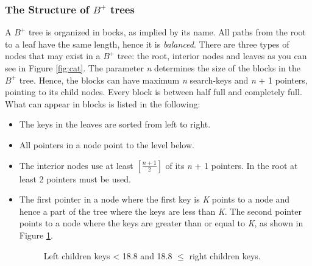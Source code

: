 \documentclass[abstracton,12pt]{scrreprt}
\begin{document}
\subsubsection{The Structure of $B^+$ trees}
\label{structureBtree}
A $B^+$ tree is organized in bocks, as implied by its name. All paths from the root to a leaf have the same length, hence it is \emph{balanced}. There are three types of nodes that may exist in a $B^+$ tree: the root, interior nodes and leaves as you can see in Figure \ref{fig:cat}. The parameter \emph{n} determines the size of the blocks in the $B^+$ tree. Hence, the blocks can have maximum \emph{n} search-keys and \emph{n} + 1 pointers, pointing to its child nodes. Every block is between half full and completely full. What can appear in blocks is listed in the following: \\
\begin{itemize}  
	\item The keys in the leaves are sorted from left to right. 
	\item All pointers in a node point to the level below.
	\item The interior nodes use at least $[\frac{n+1}{2}]$ of its \emph{n} + 1 pointers. In the root at least 2 pointers must be used. 
	\item The first pointer in a node where the first key is \emph{K} points to a node and hence a part of the tree where the keys are less than \emph{K}. The second pointer points to a node where the keys are greater than or equal to \emph{K}, as shown in Figure \ref{lessOrEqual}. 
	\begin{figure}[H]
		\centering
		\vspace{2mm}
		\caption{Left children keys < 18.8 and 18.8 $\leq$ right children keys.}
		\label{lessOrEqual}
	\end{figure}
\end{itemize}
\end{document}
